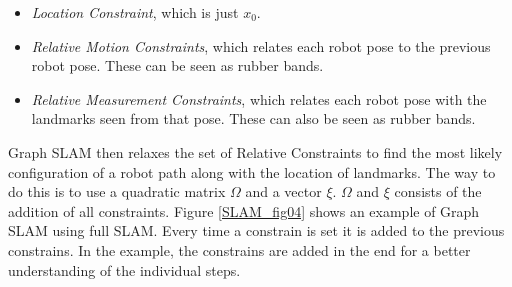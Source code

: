 \begin{itemize}
\item \textit{Location Constraint}, which is just $x_0$.
\item \textit{Relative Motion Constraints}, which relates each robot pose to the previous robot pose. These can be seen as rubber bands.
\item \textit{Relative Measurement Constraints}, which relates each robot pose with the landmarks seen from that pose. These can also be seen as rubber bands.
\end{itemize}
Graph SLAM then relaxes the set of Relative Constraints to find the most likely configuration of a robot path along with the location of landmarks.
The way to do this is to use a quadratic matrix $\Omega$ and a vector $\xi$. $\Omega$ and $\xi$ consists of the addition of all constraints. Figure \ref{SLAM_fig04} shows an example of Graph SLAM using full SLAM. Every time a constrain is set it is added to the previous constrains. In the example, the constrains are added in the end for a better understanding of the individual steps.

